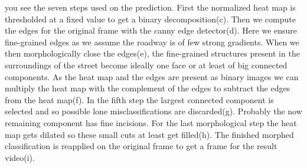 you see the seven steps used on the prediction. First the normalized heat map is thresholded at a fixed value to get a binary decomposition(c). Then we compute the edges for the original frame with the canny edge detector(d). Here we ensure fine-grained edges as we assume the roadway is of few strong gradients. When we then morphologically close the edges(e), the fine-grained structures present in the surroundings of the street become ideally one face or at least of big connected components. As the heat map and the edges are present as binary images we can multiply the heat map with the complement of the edges to subtract the edges from the heat map(f). In the fifth step the largest connected component is selected and so possible lone misclassifications are discarded(g). Probably the now remaining component has fine incisions. For the last morphological step the heat map gets dilated so these small cuts at least get filled(h). The finished morphed classification is reapplied on the original frame to get a frame for the result video(i).
